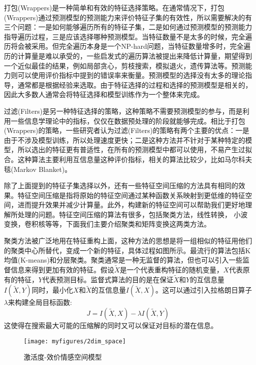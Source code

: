 打包(Wrappers)是一种简单和有效的特征选择策略。在通常情况下，打包(Wrappers)通过预测模型的预测能力来评价特征子集的有效性，所以需要解决的有三个问题：一是如何能够遍历所有的特征子集，二是如何通过预测模型的预测能力指导遍历过程，三是应该选择哪种预测模型。当特征数量不是太多的时候，完全遍历将会被采用。但完全遍历本身是一个NP-hard问题，当特征数量增多时，完全遍历的计算量是难以承受的，一些启发式的遍历算法被提出来降低计算量，期望得到一个近似最佳的结果，例如局部贪心，剪枝搜索，模拟退火，遗传算法等。预测能力则可以使用评价指标中提到的错误率来衡量。预测模型的选择没有太多的理论指导，通常都是根据经验来选取。由于特征选择的过程和选择的预测模型是相关的，因此大多数人通常会将特征选择和模型训练作为一个整体来完成。

过滤(Filters)是另一种特征选择的策略，这种策略不需要预测模型的参与，而是利用一些信息学理论中的指标，仅仅在数据预处理的阶段就能够完成。相比于打包(Wrappers)的策略，一些研究者认为过滤(Filters)的策略有两个主要的优点：一是由于不涉及模型训练，所以处理速度更快；二是这种方法并不针对于某种特定的模型，所以选出的特征更有普适性，在所有的预测模型中都可以使用，不易产生过拟合。这种算法主要利用互信息量这种评价指标，相关的算法比较少，比如马尔科夫毯(Markov Blanket)。

除了上面提到的特征子集选择以外，还有一些特征空间压缩的方法具有相同的效果。特征空间压缩是指将原始的特征空间通过某种函数关系映射到更低维的特征空间，进而提升效果并减少计算量。此外，构建新的特征空间可以帮助我们更好地理解所处理的问题。特征空间压缩的算法有很多，包括聚类方法，线性转换，
小波变换，卷积核等等，下面我们主要介绍聚类和矩阵变换这两类方法。

聚类方法被广泛地用在特征重构上面，这种方法的思想是将一组相似的特征用他们的聚类中心所替代，变成一个新的特征，具体过程如图所示。最流行的算法包括K均值(K-means)和分层聚类。聚类通常是一种无监督的算法，但也可以引入一些监督信息来得到更加有效的特征。假设$\widetilde{X}$是一个代表重构特征的随机变量，$X$代表原有的特征，$Y$代表预测目标。监督式算法的目的是在保证$\widetilde{X}$和$Y$的互信息量$I(\widetilde{X}, Y)$同时，最小化$X$和$\widetilde{X}$的互信息量$I(\widetilde{X}, X)$。这可以通过引入拉格朗日算子$\lambda$来构建全局目标函数:
\begin{equation}
\label{equ:lagrange_multiplier}
    J=I(\widetilde{X}, X) - \lambda I(\widetilde{X}, Y)
\end{equation}
这使得在搜索最大可能的压缩解的同时又可以保证对目标的潜在信息。

\begin{figure}[H] %
    \centering
    \texttt{[image: myfigures/2dim\_space]}
    \caption{激活度-效价情感空间模型}
    \label{fig:xfig1}
\end{figure}

